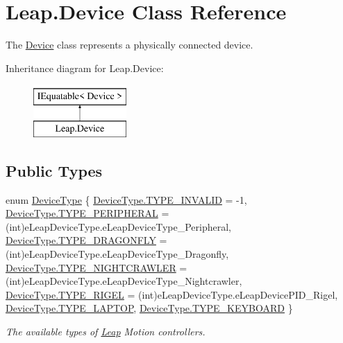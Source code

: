 \hypertarget{class_leap_1_1_device}{}\section{Leap.\+Device Class Reference}
\label{class_leap_1_1_device}


The \mbox{\hyperlink{class_leap_1_1_device}{Device}} class represents a physically connected device.  


Inheritance diagram for Leap.\+Device\+:\begin{figure}[H]
\begin{center}
\leavevmode
\includegraphics[height=2.000000cm]{class_leap_1_1_device}
\end{center}
\end{figure}
\subsection*{Public Types}
\begin{DoxyCompactItemize}
\item 
enum \mbox{\hyperlink{class_leap_1_1_device_acbae26ae873dec763876ed257b38456f}{Device\+Type}} \{ \newline
\mbox{\hyperlink{class_leap_1_1_device_acbae26ae873dec763876ed257b38456fa0fec0d0c3308929a666b6e0e02f94a6d}{Device\+Type.\+T\+Y\+P\+E\+\_\+\+I\+N\+V\+A\+L\+ID}} = -\/1, 
\mbox{\hyperlink{class_leap_1_1_device_acbae26ae873dec763876ed257b38456fa4b4e27132c1eb4e80e6a58cc3366443e}{Device\+Type.\+T\+Y\+P\+E\+\_\+\+P\+E\+R\+I\+P\+H\+E\+R\+AL}} = (int)e\+Leap\+Device\+Type.\+e\+Leap\+Device\+Type\+\_\+\+Peripheral, 
\mbox{\hyperlink{class_leap_1_1_device_acbae26ae873dec763876ed257b38456fa0b65f092fb039ea86e8346e39765c743}{Device\+Type.\+T\+Y\+P\+E\+\_\+\+D\+R\+A\+G\+O\+N\+F\+LY}} = (int)e\+Leap\+Device\+Type.\+e\+Leap\+Device\+Type\+\_\+\+Dragonfly, 
\mbox{\hyperlink{class_leap_1_1_device_acbae26ae873dec763876ed257b38456fa36d0d277f075f0eed6bc1625f96e5594}{Device\+Type.\+T\+Y\+P\+E\+\_\+\+N\+I\+G\+H\+T\+C\+R\+A\+W\+L\+ER}} = (int)e\+Leap\+Device\+Type.\+e\+Leap\+Device\+Type\+\_\+\+Nightcrawler, 
\newline
\mbox{\hyperlink{class_leap_1_1_device_acbae26ae873dec763876ed257b38456fae52aa636b0e3355c6f530f1d55d93f26}{Device\+Type.\+T\+Y\+P\+E\+\_\+\+R\+I\+G\+EL}} = (int)e\+Leap\+Device\+Type.\+e\+Leap\+Device\+P\+I\+D\+\_\+\+Rigel, 
\mbox{\hyperlink{class_leap_1_1_device_acbae26ae873dec763876ed257b38456faf66ee867466be4d1e2f97607e7107873}{Device\+Type.\+T\+Y\+P\+E\+\_\+\+L\+A\+P\+T\+OP}}, 
\mbox{\hyperlink{class_leap_1_1_device_acbae26ae873dec763876ed257b38456fa994cb90fbc17743966246915db45862a}{Device\+Type.\+T\+Y\+P\+E\+\_\+\+K\+E\+Y\+B\+O\+A\+RD}}
 \}
\begin{DoxyCompactList}\small\item\em The available types of \mbox{\hyperlink{namespace_leap}{Leap}} Motion controllers. \end{DoxyCompactList}\end{DoxyCompactItemize}
